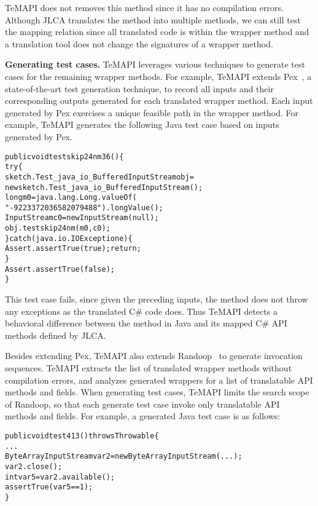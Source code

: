 TeMAPI does not removes this method since it has no compilation errors. Although JLCA translates the  method into multiple methods, we can still test the mapping relation since all translated code is within the wrapper method and a translation tool does not change the signatures of a wrapper method.  

\textbf{Generating test cases.} TeMAPI leverages various techniques to generate test cases for the remaining wrapper methods. For example, TeMAPI extends Pex~\cite{tillmann2008pex}, a state-of-the-art test generation technique, to record all inputs and their corresponding outputs generated for each translated wrapper method. Each input generated by Pex exercises a unique feasible path in the wrapper method. For example, TeMAPI generates the following Java test case based on inputs generated by Pex.

\begin{CodeOut}\vspace*{-1ex}
\begin{alltt}
public void testskip24nm36()\{
  try\{
     sketch.Test_java_io_BufferedInputStream obj = 
        new sketch.Test_java_io_BufferedInputStream();
     long m0 = java.lang.Long.valueOf(
                  "-9223372036582079488").longValue();
     InputStream c0 = new InputStream(null);
     obj.testskip24nm(m0,c0);
  \}catch(java.io.IOException e)\{
     Assert.assertTrue(true);return;
  \}
  Assert.assertTrue(false);
\}
\end{alltt}
\end{CodeOut}\vspace*{-2ex}

This test case fails, since given the preceding inputs, the  method does not throw any exceptions as the translated C\# code does. Thus TeMAPI detects a behavioral difference between the  method in Java and its mapped C\# API methods defined by JLCA.

Besides extending Pex, TeMAPI also extends Randoop~\cite{pacheco2007feedback} to generate invocation sequences. TeMAPI extracts the list of translated wrapper methods without compilation errors, and analyzes generated wrappers for a list of translatable API methods and fields. When generating test cases, TeMAPI limits the search scope of Randoop, so that each generate test case invoke only translatable API methods and fields. For example, a generated Java test case is as follows:

\begin{CodeOut}\vspace*{-1ex}
\begin{alltt}
public void test413() throws Throwable\{
  ...
  ByteArrayInputStream var2=new ByteArrayInputStream(...);
  var2.close();
  int var5=var2.available();
  assertTrue(var5 == 1);
\}
\end{alltt}
\end{CodeOut}\vspace*{-2ex}


